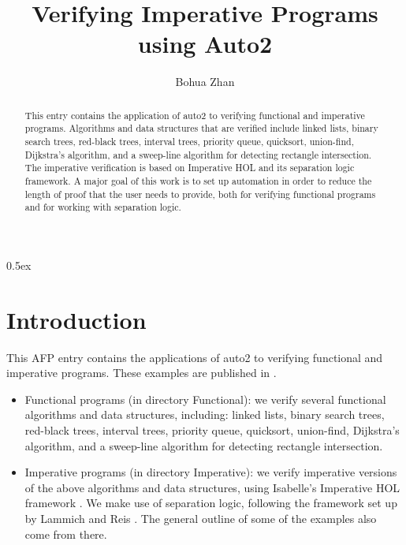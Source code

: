 \documentclass[11pt,a4paper]{article}
\begin{document}
\title{Verifying Imperative Programs using Auto2}
\author{Bohua Zhan}
\maketitle

\begin{abstract}
  This entry contains the application of auto2 to verifying functional
  and imperative programs. Algorithms and data structures that are
  verified include linked lists, binary search trees, red-black trees,
  interval trees, priority queue, quicksort, union-find, Dijkstra's
  algorithm, and a sweep-line algorithm for detecting rectangle
  intersection. The imperative verification is based on Imperative HOL
  and its separation logic framework. A major goal of this work is to
  set up automation in order to reduce the length of proof that the
  user needs to provide, both for verifying functional programs and
  for working with separation logic.
\end{abstract}

\newpage
\tableofcontents
\newpage
\parindent 0pt\parskip 0.5ex

\section{Introduction}

This AFP entry contains the applications of auto2 to verifying
functional and imperative programs. These examples are published in
\cite{zhan18a}.

\begin{itemize}
\item Functional programs (in directory Functional): we verify
  several functional algorithms and data structures, including: linked
  lists, binary search trees, red-black trees, interval trees,
  priority queue, quicksort, union-find, Dijkstra's algorithm, and a
  sweep-line algorithm for detecting rectangle intersection.

\item Imperative programs (in directory Imperative): we verify
  imperative versions of the above algorithms and data structures,
  using Isabelle's Imperative HOL framework \cite{imphol}. We make use
  of separation logic, following the framework set up by Lammich and
  Reis \cite{Separation_Logic_Imperative_HOL-AFP}. The general outline
  of some of the examples also come from there.
\end{itemize}





\end{document}
